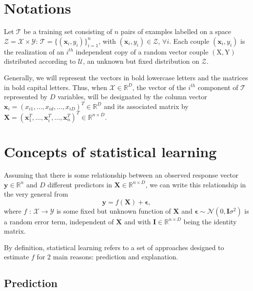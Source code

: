 \documentclass[]{book}
\begin{document}
\hypertarget{notations-1}{%
\section{Notations}\label{notations-1}}

Let \(\mathcal{T}\) be a training set consisting of \(n\) pairs of examples
labelled on a space \(\mathcal{Z} = \mathcal{X} \times \mathcal{Y}\):
\(\mathcal{T} = \{(\boldsymbol{x}_{i}, y_{i})\}_{i=1}^{n}\), with
\((\boldsymbol{x}_{i}, y_{i}) \in \mathcal{Z}\), \(\forall i\). Each couple
\((\boldsymbol{x}_{i}, y_{i})\) is the realization of an \(i^{th}\) independent copy
of a random vector couple \((\mathrm{X}, \mathrm{Y})\) distributed according to
\(\mathcal{U}\), an unknown but fixed distribution on \(\mathcal{Z}\).

Generally, we will represent the vectors in bold lowercase letters and
the matrices in bold capital letters. Thus, when \(\mathcal{X} \in \mathbb{R}^D\),
the vector of the \(i^{th}\) component of \(\mathcal{T}\) represented by \(D\)
variables, will be designated by the column vector
\(\boldsymbol{x}_i = (x_{i1}, \dots, x_{id}, \dots, x_{iD})^T \in \mathbb{R}^D\) and its
associated matrix by
\(\mathbf{X} = (\boldsymbol{x}_1^T, \dots, \boldsymbol{x}_i^T, \dots, \boldsymbol{x}_n^T)^T \in \mathbb{R}^{n \times D}\).

\hypertarget{concepts-of-statistical-learning}{%
\section{Concepts of statistical learning}\label{concepts-of-statistical-learning}}

Assuming that there is some relationship between an observed response
vector \(\mathbf{y} \in \mathbb{R}^n\) and \(D\) different predictors in
\(\mathbf{X} \in \mathbb{R}^{n \times D}\), we can write this relationship in the very
general from \[\mathbf{y} = f(\mathbf{X}) + \boldsymbol{\epsilon} ,\] where \(f\) :
\(\mathcal{X} \rightarrow \mathcal{Y}\) is some fixed but unknown function of
\(\mathbf{X}\) and \(\boldsymbol{\epsilon} \sim \mathcal{N}(0, \mathbf{I}\sigma^2)\) is a random error
term, independent of \(\mathbf{X}\) and with \(\mathbf{I} \in \mathbb{R}^{n \times D}\) being the
identity matrix.

By definition, statistical learning refers to a set of approaches
designed to estimate \(f\) for 2 main reasons: prediction and explanation.

\hypertarget{prediction}{%
\subsection{Prediction}\label{prediction}}
\end{document}
